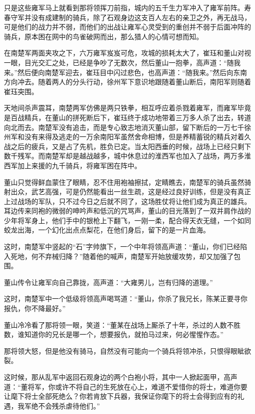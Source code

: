 只是这些雍军马上就看到那将领挥刀前指，城内的五千生力军冲入了雍军前阵。寿春守军并没有成建制的骑兵，除了石观身边这支百人左右的亲卫之外，再无战马，可是他们的战力并不弱，而他们的出战让雍军心灵受到的重创并不弱于后面冲阵的骑兵，原本困在网中的鸟雀破网而出，那么猎人的心情可想而知。

在南楚军两面夹攻之下，六万雍军岌岌可危，攻城的损耗太大了，崔珏和董山对视一眼，目光交汇之处，已经是争吵了无数次，然后董山一抱拳，高声道：“随我来。”然后便向南楚军迎去，崔珏目中闪过悲色，也高声道：“随我来。”然后向东南方向冲去。随着两人的分头行动，徐州军下意识地跟随着董山断后，南阳军则随着崔珏突围。

天地间杀声震耳，南楚两军仿佛是两只铁拳，相互呼应着杀戮着雍军，而雍军毕竟是百战精兵，在董山的拼死断后下，崔珏终于成功地带着三万多人杀了出去，转道向北而去。南楚军没有追击，而是专心致志地消灭董山部，留下断后的一万七千徐州军和没有来得及逃走的一万余南阳军虽然舍命相博，但是养精蓄锐的精兵对着久战之后的疲兵，又是占了先机，胜负已定。当太阳西垂的时候，战场上已经只剩下数千残军。而南楚军却是越战越多，城中休息过的淮西军也加入了战场，两万多淮西军加上来援的九千骑兵，将雍军困在阵中。

董山只觉得鲜血蒙住了眼睛，忍不住用袍袖擦拭，定睛瞧去，南楚军的骑兵虽然骑射出众，武艺高强，可是仍然能看出一丝生疏，这是经过良好训练，但是没有真正上过战场的军队，只不过今日之后就不同了，这场胜仗将让他们成为真正的雄兵。耳边传来同袍的微弱的呻吟声和低沉的咒骂声，董山的目光落到了一双并肩作战的少年将军身上，他们手中的银枪上下翻飞，一刚一柔，配合得天衣无缝，一个如同蛟龙出海，一个幻化出点点梨花，在他们身后，留下的是一片血海。

这时，南楚军中竖起的“石”字帅旗下，一个中年将领高声道：“董山，你们已经陷入死地，何不弃械归降？”随着他的喊声，南楚军开始放缓攻势，却又加强了包围。

董山传令让雍军向自己靠拢，高声道：“大雍男儿，岂有归降的道理。”

这时，南楚军中一个低级将领高声喝骂道：“董山，你杀了我兄长，陈某正要寻你报仇，你不降最好。”

董山冷冷看了那将领一眼，笑道：“董某在战场上厮杀了十年，杀过的人数不胜数，谁知道你的兄长是哪一个，想要报仇，就拍马过来，何必惺惺作态。”

那将领大怒，但是他没有骑马，自然没有可能向一个骑兵将领冲杀，只恨得眼眦欲裂。

这时候，那从乱军中返回石观身边的两个白袍小将，其中一人掀起面甲，高声道：“董将军，你或许不将自己的生死放在心上，难道不爱惜你的将士，难道你要让麾下将士全部死绝么？你若肯放下兵器，我保证你麾下的将士会得到应有的礼遇，我军绝不会残杀虐待他们。”


